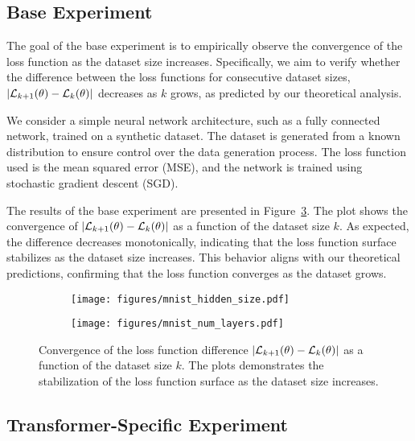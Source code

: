 \documentclass{article}
\begin{document}
\subsection{Base Experiment}

The goal of the base experiment is to empirically observe the convergence of the loss function as the dataset size increases. Specifically, we aim to verify whether the difference between the loss functions for consecutive dataset sizes, $|\mathcal{L}_{k + 1}(\theta) - \mathcal{L}_{k}(\theta)|$
decreases as $k$ grows, as predicted by our theoretical analysis.

We consider a simple neural network architecture, such as a fully connected network, trained on a synthetic dataset. The dataset is generated from a known distribution to ensure control over the data generation process. The loss function used is the mean squared error (MSE), and the network is trained using stochastic gradient descent (SGD).

The results of the base experiment are presented in Figure~\ref{fig:base_experiment}. The plot shows the convergence of $|\mathcal{L}_{k + 1}(\theta) - \mathcal{L}_{k}(\theta)|$ as a function of the dataset size $k$. As expected, the difference decreases monotonically, indicating that the loss function surface stabilizes as the dataset size increases. This behavior aligns with our theoretical predictions, confirming that the loss function converges as the dataset grows.

\begin{figure}[h]
\centering
\begin{subfigure}[b]{0.48\linewidth}
    \texttt{[image: figures/mnist\_hidden\_size.pdf]}
    \caption{}
    \label{fig:base_mnist_hidden_size}
\end{subfigure}
\hfill
\begin{subfigure}[b]{0.48\linewidth}
    \texttt{[image: figures/mnist\_num\_layers.pdf]}
    \caption{}
    \label{fig:base_mnist_num_layers}
\end{subfigure}
\caption{Convergence of the loss function difference 
$|\mathcal{L}_{k + 1}(\theta) - \mathcal{L}_{k}(\theta)|$ as a function of the dataset size $k$. 
The plots demonstrates the stabilization of the loss function surface as the dataset size increases.}
\label{fig:base_experiment}
\end{figure}
\subsection{Transformer-Specific Experiment}
\end{document}
